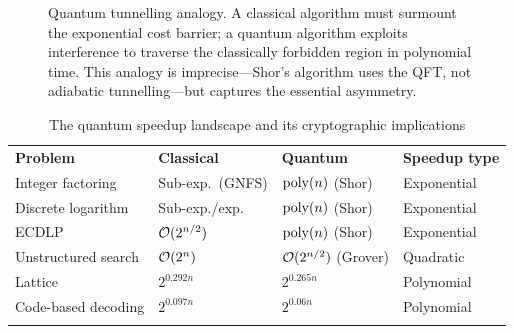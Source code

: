 \begin{figure}[t]
\centering
{}
\caption{Quantum tunnelling analogy.  A classical algorithm must surmount the exponential cost barrier; a quantum algorithm exploits interference to traverse the classically forbidden region in polynomial time.  This analogy is imprecise---Shor's algorithm uses the QFT, not adiabatic tunnelling---but captures the essential asymmetry.}
\label{fig:ch04-quantum-tunneling}
\end{figure}

\begin{table}[t]
\caption{The quantum speedup landscape and its cryptographic implications}
\label{tab:quantum-landscape}
\begin{tabular}{p{3.5cm}p{2.5cm}p{2.5cm}p{2.5cm}}
\hline\noalign{\smallskip}
\textbf{Problem} & \textbf{Classical} & \textbf{Quantum} & \textbf{Speedup type} \\
\noalign{\smallskip}\svhline\noalign{\smallskip}
Integer factoring & Sub-exp.\ (GNFS) & $\operatorname{poly}(n)$ (Shor) & Exponential \\
Discrete logarithm & Sub-exp./exp. & $\operatorname{poly}(n)$ (Shor) & Exponential \\
ECDLP & $\mathcal{O}(2^{n/2})$ & $\operatorname{poly}(n)$ (Shor) & Exponential \\
Unstructured search & $\mathcal{O}(2^n)$ & $\mathcal{O}(2^{n/2})$ (Grover) & Quadratic \\
Lattice \svp{} & $2^{0.292n}$ & $2^{0.265n}$ & Polynomial \\
Code-based decoding & $2^{0.097n}$ & $2^{0.06n}$ & Polynomial \\
\noalign{\smallskip}\hline
\end{tabular}
\end{table}

